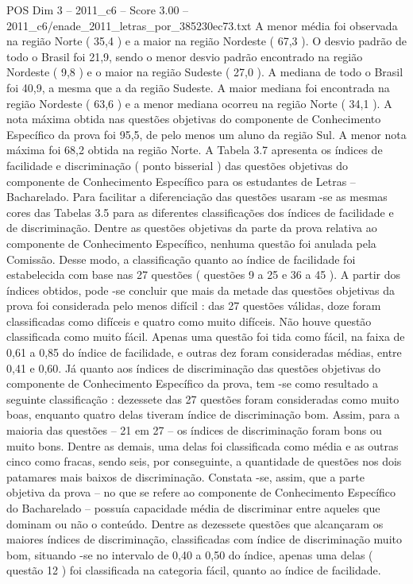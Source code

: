\begin{textsample}{POS Dim 3 – 2011\_c6 – Score 3.00 – 2011\_c6/enade\_2011\_letras\_por\_385230ec73.txt}
A menor média foi observada na região Norte ( 35,4 ) e a maior na região Nordeste ( 67,3 ).
O desvio padrão de todo o Brasil foi 21,9, sendo o menor desvio padrão encontrado na região Nordeste ( 9,8 ) e o maior na região Sudeste ( 27,0 ).
A mediana de todo o Brasil foi 40,9, a mesma que a da região Sudeste.
A maior mediana foi encontrada na região Nordeste ( 63,6 ) e a menor mediana ocorreu na região Norte ( 34,1 ).
A nota máxima obtida nas questões objetivas do componente de Conhecimento Específico da prova foi 95,5, de pelo menos um aluno da região Sul.
A menor nota máxima foi 68,2 obtida na região Norte.
A Tabela 3.7 apresenta os índices de facilidade e discriminação ( ponto bisserial ) das questões objetivas do componente de Conhecimento Específico para os estudantes de Letras – Bacharelado.
Para facilitar a diferenciação das questões usaram -se as mesmas cores das Tabelas 3.5 para as diferentes classificações dos índices de facilidade e de discriminação.
Dentre as questões objetivas da parte da prova relativa ao componente de Conhecimento Específico, nenhuma questão foi anulada pela Comissão.
Desse modo, a classificação quanto ao índice de facilidade foi estabelecida com base nas 27 questões ( questões 9 a 25 e 36 a 45 ).
A partir dos índices obtidos, pode -se concluir que mais da metade das questões objetivas da prova foi considerada pelo menos difícil : das 27 questões válidas, doze foram classificadas como difíceis e quatro como muito difíceis.
Não houve questão classificada como muito fácil.
Apenas uma questão foi tida como fácil, na faixa de 0,61 a 0,85 do índice de facilidade, e outras dez foram consideradas médias, entre 0,41 e 0,60.
Já quanto aos índices de discriminação das questões objetivas do componente de Conhecimento Específico da prova, tem -se como resultado a seguinte classificação : dezessete das 27 questões foram consideradas como muito boas, enquanto quatro delas tiveram índice de discriminação bom.
Assim, para a maioria das questões – 21 em 27 – os índices de discriminação foram bons ou muito bons.
Dentre as demais, uma delas foi classificada como média e as outras cinco como fracas, sendo seis, por conseguinte, a quantidade de questões nos dois patamares mais baixos de discriminação.
Constata -se, assim, que a parte objetiva da prova – no que se refere ao componente de Conhecimento Específico do Bacharelado – possuía capacidade média de discriminar entre aqueles que dominam ou não o conteúdo.
Dentre as dezessete questões que alcançaram os maiores índices de discriminação, classificadas com índice de discriminação muito bom, situando -se no intervalo de 0,40 a 0,50 do índice, apenas uma delas ( questão 12 ) foi classificada na categoria fácil, quanto ao índice de facilidade.

\end{textsample}
